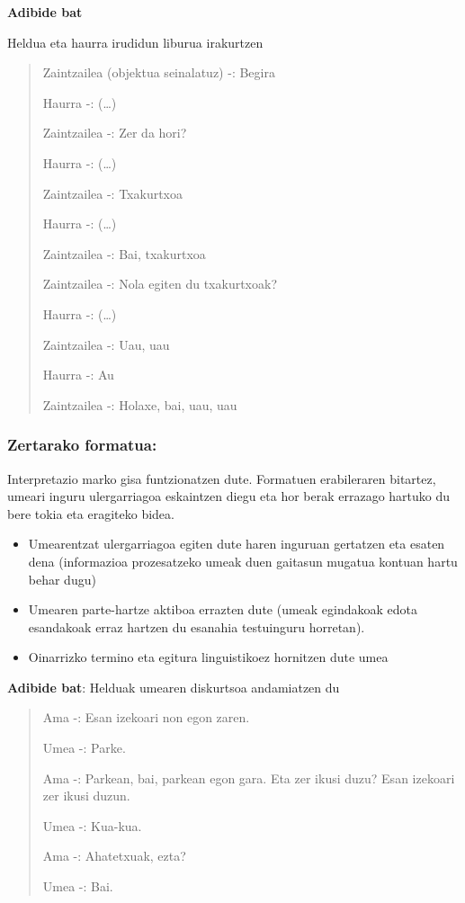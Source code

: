 \documentclass[
]{book}
\providecommand{\tightlist}{%
  \setlength{\itemsep}{0pt}\setlength{\parskip}{0pt}}
\begin{document}
\textbf{Adibide bat}

Heldua eta haurra irudidun liburua irakurtzen

\begin{quote}
Zaintzailea (objektua seinalatuz) -: Begira

Haurra -: (\ldots)

Zaintzailea -: Zer da hori?

Haurra -: (\ldots)

Zaintzailea -: Txakurtxoa

Haurra -: (\ldots)

Zaintzailea -: Bai, txakurtxoa

Zaintzailea -: Nola egiten du txakurtxoak?

Haurra -: (\ldots)

Zaintzailea -: Uau, uau

Haurra -: Au

Zaintzailea -: Holaxe, bai, uau, uau
\end{quote}

\hypertarget{zertarako-formatua}{%
\subsubsection{Zertarako formatua:}\label{zertarako-formatua}}

Interpretazio marko gisa funtzionatzen dute. Formatuen erabileraren bitartez, umeari inguru ulergarriagoa eskaintzen diegu eta hor berak errazago hartuko du bere tokia eta eragiteko bidea.

\begin{itemize}
\tightlist
\item
  Umearentzat ulergarriagoa egiten dute haren inguruan gertatzen eta esaten dena (informazioa prozesatzeko umeak duen gaitasun mugatua kontuan hartu behar dugu)
\item
  Umearen parte-hartze aktiboa errazten dute (umeak egindakoak edota esandakoak erraz hartzen du esanahia testuinguru horretan).
\item
  Oinarrizko termino eta egitura linguistikoez hornitzen dute umea
\end{itemize}

\textbf{Adibide bat}: Helduak umearen diskurtsoa andamiatzen du

\begin{quote}
Ama -: Esan izekoari non egon zaren.

Umea -: Parke.

Ama -: Parkean, bai, parkean egon gara. Eta zer ikusi duzu? Esan izekoari zer ikusi duzun.

Umea -: Kua-kua.

Ama -: Ahatetxuak, ezta?

Umea -: Bai.
\end{quote}
\end{document}
